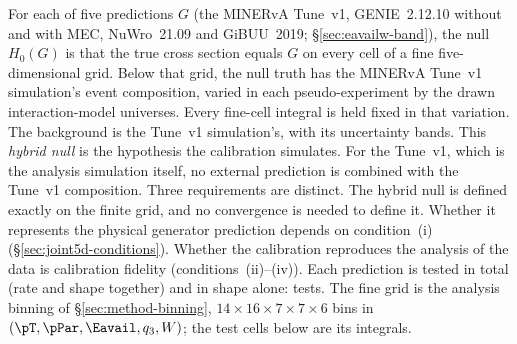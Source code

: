 For each of five predictions $G$ (the MINERvA Tune~v1, GENIE~2.12.10 without and with MEC, NuWro~21.09 and GiBUU~2019; \S\ref{sec:eavailw-band}), the null $H_{0}(G)$ is that the true cross section equals $G$ on every cell of a fine five-dimensional grid. Below that grid, the null truth has the MINERvA Tune~v1 simulation's event composition, varied in each pseudo-experiment by the drawn interaction-model universes. Every fine-cell integral is held fixed in that variation. The background is the Tune~v1 simulation's, with its uncertainty bands. This \emph{hybrid null} is the hypothesis the calibration simulates. For the Tune~v1, which is the analysis simulation itself, no external prediction is combined with the Tune~v1 composition. Three requirements are distinct. The hybrid null is defined exactly on the finite grid, and no convergence is needed to define it. Whether it represents the physical generator prediction depends on condition~(i) (\S\ref{sec:joint5d-conditions}). Whether the calibration reproduces the analysis of the data is calibration fidelity (conditions~(ii)--(iv)). Each prediction is tested in total (rate and shape together) and in shape alone: \jtNtests{} tests. The fine grid is the analysis binning of \S\ref{sec:method-binning}, $14\times16\times7\times7\times6$ bins in $(\pT,\pPar,\Eavail,q_{3},W)$; the test cells below are its integrals.


